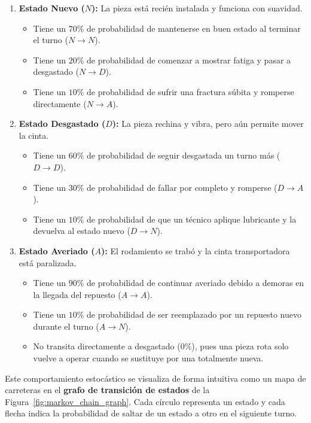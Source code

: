 \begin{enumerate}
  \item \textbf{Estado Nuevo ($N$):} La pieza está recién instalada y funciona con suavidad.
  \begin{itemize}
    \item Tiene un $70\%$ de probabilidad de mantenerse en buen estado al terminar el turno ($N \to N$).
    \item Tiene un $20\%$ de probabilidad de comenzar a mostrar fatiga y pasar a desgastado ($N \to D$).
    \item Tiene un $10\%$ de probabilidad de sufrir una fractura súbita y romperse directamente ($N \to A$).
  \end{itemize}

  \item \textbf{Estado Desgastado ($D$):} La pieza rechina y vibra, pero aún permite mover la cinta.
  \begin{itemize}
    \item Tiene un $60\%$ de probabilidad de seguir desgastada un turno más ($D \to D$).
    \item Tiene un $30\%$ de probabilidad de fallar por completo y romperse ($D \to A$).
    \item Tiene un $10\%$ de probabilidad de que un técnico aplique lubricante y la devuelva al estado nuevo ($D \to N$).
  \end{itemize}

  \item \textbf{Estado Averiado ($A$):} El rodamiento se trabó y la cinta transportadora está paralizada.
  \begin{itemize}
    \item Tiene un $90\%$ de probabilidad de continuar averiado debido a demoras en la llegada del repuesto ($A \to A$).
    \item Tiene un $10\%$ de probabilidad de ser reemplazado por un repuesto nuevo durante el turno ($A \to N$).
    \item No transita directamente a desgastado ($0\%$), pues una pieza rota solo vuelve a operar cuando se sustituye por una totalmente nueva.
  \end{itemize}
\end{enumerate}

Este comportamiento estocástico se visualiza de forma intuitiva como un mapa de carreteras en el \textbf{grafo de transición de estados} de la Figura~\ref{fig:markov_chain_graph}. Cada círculo representa un estado y cada flecha indica la probabilidad de saltar de un estado a otro en el siguiente turno.

